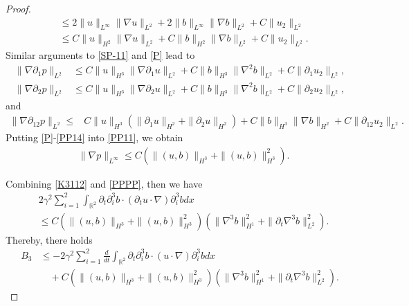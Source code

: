 \documentclass[reqno,11pt]{amsart}
\def\R{\mathbb R}
\numberwithin{Thm}{section}
\begin{document}
\begin{proof}
\begin{align}
&\leq2\|u\|_{L^\infty}\|\nabla u\|_{L^{2}}+2\|b\|_{L^\infty}\|\nabla b\|_{L^{2}}+C\|u_2\|_{L^2}\nonumber\\
&\leq C\|u\|_{H^2}\|\nabla u\|_{L^{2}}+C\|b\|_{H^2}\|\nabla b\|_{L^{2}}+C\|u_2\|_{L^2}.
\end{align}
 Similar arguments to \eqref{SP-11} and \eqref{P} lead to
\begin{align}\label{PP12}
\|\nabla\partial_1 p\|_{L^2}
&\leq C\|u\|_{H^3}\|\nabla \partial_1u\|_{L^{2}}+C\|b\|_{H^3}\|\nabla^2 b\|_{L^{2}}+C\|\partial_1u_2\|_{L^2},
\end{align}
\begin{align}\label{PP13}
\|\nabla\partial_2 p\|_{L^2}
&\leq C\|u\|_{H^3}\|\nabla\partial_2u\|_{L^{2}}+C\|b\|_{H^3}\|\nabla^2 b\|_{L^{2}}+C\|\partial_2u_2\|_{L^2},
\end{align}
and
\begin{align}\label{PP14}
\|\nabla\partial_{12} p\|_{L^2}
\leq&C\|u\|_{H^3}\left(\|\partial_1u\|_{H^{2}}+\|\partial_2u\|_{H^{2}}\right)+C\|b\|_{H^3}\|\nabla b\|_{H^{2}}+C\|\partial_{12}u_2\|_{L^2}.
\end{align}
Putting \eqref{P}-\eqref{PP14} into \eqref{PP11}, we obtain
\begin{align}\label{PPPP}
&\|\nabla p\|_{L^{\infty}}\leq C\left(\|(u,b)\|_{H^{3}}+\|(u,b)\|_{H^{3}}^2\right).
\end{align}



Combining \eqref{K3112} and \eqref{PPPP}, then we have
\begin{align}\label{A8-8}
&2\gamma^2\sum_{i=1}^2\int_{\R^2}\partial_{t}\partial_i^3b\cdot (\partial_{t}u\cdot\nabla)\partial_i^3 bdx\nonumber\\
&\leq C\left(\|(u,b)\|_{H^{3}}+\|(u,b)\|_{H^{3}}^2\right)
\left(\|\nabla^3 b\|_{H^1}^2+\|\partial_t\nabla^3 b\|_{L^2}^2\right).
\end{align}
Thereby, there holds
\begin{align}\label{A8}
B_{3}
&\leq-2\gamma^2\sum_{i=1}^2\frac{d}{dt}\int_{\R^2}\partial_{t}\partial_i^3b\cdot (u\cdot\nabla)\partial_i^3 bdx\nonumber\\
&\quad+C\left(\|(u,b)\|_{H^{3}}+\|(u,b)\|_{H^{3}}^2\right)
\left(\|\nabla^3 b\|_{H^1}^2+\|\partial_t\nabla^3 b\|_{L^2}^2\right).
\end{align}



\end{proof}
\end{document}
